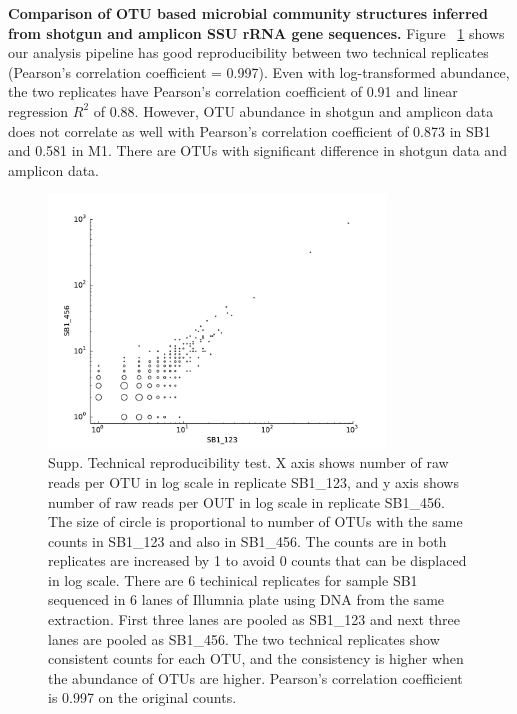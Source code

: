 \documentclass[12pt]{article}
\begin{document}
  {\bf Comparison of OTU based microbial community structures inferred from shotgun and amplicon SSU rRNA gene sequences. }
  Figure ~\ref{fig:SB1_techrep_OTUscat} shows our analysis pipeline has good reproducibility between two technical replicates (Pearson’s correlation coefficient = 0.997). Even with log-transformed abundance, the two replicates have Pearson’s correlation coefficient of 0.91 and linear regression $R^2$ of 0.88. However, OTU abundance in shotgun and amplicon data does not correlate as well with Pearson’s correlation coefficient of 0.873 in SB1 and 0.581 in M1. There are OTUs with significant difference in shotgun data and amplicon data.

\begin{figure}[tbph!]
  \centering
  \includegraphics[width=0.8\textwidth]{figs/SB1_techrep_OTUscat}
  \caption[Technical reproducibilty test]{Supp. Technical reproducibility test. X axis shows number of raw reads per OTU in log scale in replicate SB1\_123, and y axis shows number of raw reads per OUT in log scale in replicate SB1\_456. The size of circle is proportional to number of OTUs with the same counts in SB1\_123 and also in SB1\_456. The counts are in both replicates are increased by 1 to avoid 0 counts that can be displaced in log scale. There are 6 techinical replicates for sample SB1 sequenced in 6 lanes of Illumnia plate using DNA from the same extraction. First three lanes are pooled as SB1\_123 and next three lanes are pooled as SB1\_456. The two technical replicates show consistent counts for each OTU, and the consistency is higher when the abundance of OTUs are higher. Pearson’s correlation coefficient is 0.997 on the original counts.}
  \label{fig:SB1_techrep_OTUscat}
\end{figure}
\end{document}
